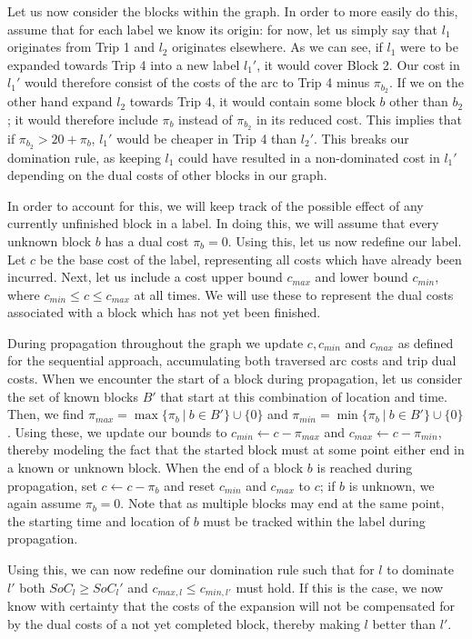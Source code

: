 \documentclass[]{article}
\begin{document}
Let us now consider the blocks within the graph. In order to more easily do this, assume that for each label we know its origin: for now, let us simply say that $l_1$ originates from Trip 1 and $l_2$ originates elsewhere. As we can see, if $l_1$ were to be expanded towards Trip 4 into a new label $l_1'$, it would cover Block 2. Our cost in $l_1'$ would therefore consist of the costs of the arc to Trip 4 minus $\pi_{b_2}$. If we on the other hand expand $l_2$ towards Trip 4, it would contain some block $b$ other than $b_2$; it would therefore include $\pi_b$ instead of $\pi_{b_2}$ in its reduced cost. This implies that if $\pi_{b_2} > 20 + \pi_b$, $l_1'$ would be cheaper in Trip 4 than $l_2'$. This breaks our domination rule, as keeping $l_1$ could have resulted in a non-dominated cost in $l_1'$ depending on the dual costs of other blocks in our graph.

In order to account for this, we will keep track of the possible effect of any currently unfinished block in a label. In doing this, we will assume that every unknown block $b$ has a dual cost $\pi_b = 0$. Using this, let us now redefine our label. Let $c$ be the base cost of the label, representing all costs which have already been incurred. Next, let us include a cost upper bound $c_{max}$ and lower bound $c_{min}$, where $c_{min} \leq c \leq c_{max}$ at all times. We will use these to represent the dual costs associated with a block which has not yet been finished. 

During propagation throughout the graph we update $c, c_{min}$ and $c_{max}$ as defined for the sequential approach, accumulating both traversed arc costs and trip dual costs. When we encounter the start of a block during propagation, let us consider the set of known blocks $B'$ that start at this combination of location and time. Then, we find $\pi_{max} = \max \{ \pi_{b} \:|\: b \in B' \} \cup \{ 0 \}$ and $\pi_{min} = \min \{ \pi_{b} \:|\: b \in B' \} \cup \{ 0 \}$.  Using these, we update our bounds to $c_{min} \gets c - \pi_{max}$ and $c_{max} \gets c - \pi_{min}$, thereby modeling the fact that the started block must at some point either end in a known or unknown block. When the end of a block $b$ is reached during propagation, set $c \gets c - \pi_b$ and reset $c_{min}$ and $c_{max}$ to $c$; if $b$ is unknown, we again assume $\pi_b = 0$. Note that as multiple blocks may end at the same point, the starting time and location of $b$ must be tracked within the label during propagation. 

Using this, we can now redefine our domination rule such that for $l$ to dominate $l'$ both $SoC_l \geq SoC_l'$ and $c_{max,l} \leq c_{min,l'}$ must hold. If this is the case, we now know with certainty that the costs of the expansion will not be compensated for by the dual costs of a not yet completed block, thereby making $l$ better than $l'$.
\end{document}
